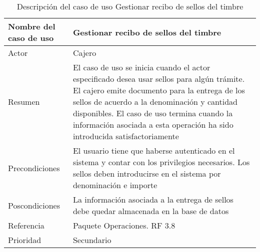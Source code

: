 \begin{table}[H]
	\sf
	\begin{supertabular}{|p{4.5cm}|p{12cm}|}
		\hline
		\textbf{Nombre del caso de uso}
		& \textbf{Gestionar recibo de sellos del timbre} \\ \hline
		
		Actor
		& Cajero \\ \hline
		
		Resumen
		& El caso de uso se inicia cuando el actor especificado desea usar sellos para algún trámite. El cajero emite documento para la entrega de los sellos de acuerdo a la denominación y cantidad disponibles. El caso de uso termina cuando la información asociada a esta operación ha sido introducida satisfactoriamente \\ \hline
		
		Precondiciones
		& El usuario tiene que haberse autenticado en el sistema y contar con los privilegios necesarios. Los sellos deben introducirse en el sistema por denominación e importe \\ \hline
		
		Poscondiciones
		& La información asociada a la entrega de sellos debe quedar almacenada en la base de datos \\ \hline
		
		Referencia
		& Paquete Operaciones. RF 3.8 \\ \hline
		
		Prioridad
		& Secundario \\		
		\hline
	\end{supertabular}
	\caption[Descripción del caso de uso Gestionar recibo de sellos del timbre]{Descripción del caso de uso Gestionar recibo de sellos del timbre}
	\label{table:CU_GestSellos}
\end{table}

